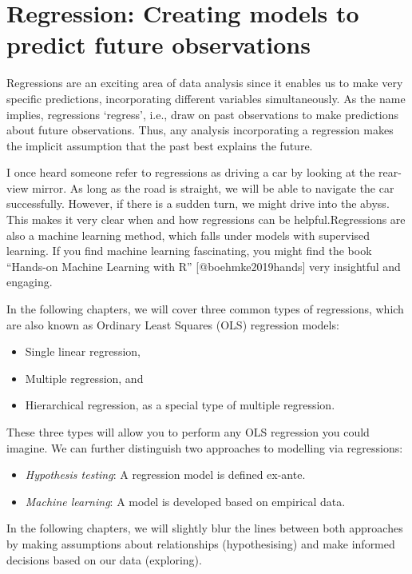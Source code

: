 \documentclass[
]{book}
\begin{document}
\hypertarget{regression}{%
\chapter{Regression: Creating models to predict future observations}\label{regression}}

Regressions are an exciting area of data analysis since it enables us to make very specific predictions, incorporating different variables simultaneously. As the name implies, regressions `regress', i.e., draw on past observations to make predictions about future observations. Thus, any analysis incorporating a regression makes the implicit assumption that the past best explains the future.

I once heard someone refer to regressions as driving a car by looking at the rear-view mirror. As long as the road is straight, we will be able to navigate the car successfully. However, if there is a sudden turn, we might drive into the abyss. This makes it very clear when and how regressions can be helpful.Regressions are also a machine learning method, which falls under models with supervised learning. If you find machine learning fascinating, you might find the book ``Hands-on Machine Learning with R'' {[}@boehmke2019hands{]} very insightful and engaging.

In the following chapters, we will cover three common types of regressions, which are also known as Ordinary Least Squares (OLS) regression models:

\begin{itemize}
\item
  Single linear regression,
\item
  Multiple regression, and
\item
  Hierarchical regression, as a special type of multiple regression.
\end{itemize}

These three types will allow you to perform any OLS regression you could imagine. We can further distinguish two approaches to modelling via regressions:

\begin{itemize}
\item
  \emph{Hypothesis testing}: A regression model is defined ex-ante.
\item
  \emph{Machine learning}: A model is developed based on empirical data.
\end{itemize}

In the following chapters, we will slightly blur the lines between both approaches by making assumptions about relationships (hypothesising) and make informed decisions based on our data (exploring).
\end{document}

